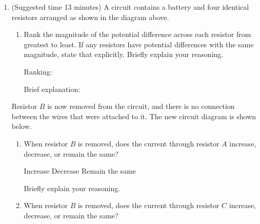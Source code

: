 \documentclass{../../../oss-apphys}
\begin{document}
\newpage


\genfreedirections

\begin{center}
\end{center}
\begin{enumerate}[leftmargin=15pt]

\item (Suggested time 13 minutes) A circuit contains a battery and four
  identical resistors arranged as shown in the diagram above.
  \begin{enumerate}[leftmargin=15pt]
  \item Rank the magnitude of the potential difference across each resistor
    from greatest to least. If any resistors have potential differences with
    the same magnitude, state that explicitly. Briefly explain your reasoning.

    \vspace{.1in}Ranking:
    
    \vspace{.3in}Brief explanation:
  \end{enumerate}
  \vspace{.3in}Resistor $B$ is now removed from the circuit, and there is no
  connection between the wires that were attached to it. The new circuit
  diagram is shown below.
  \begin{center}
  \end{center}
  \begin{enumerate}[leftmargin=15pt,resume]
  \item When resistor $B$ is removed, does the current through resistor $A$
    increase, decrease, or remain the same?

    \vspace{.1in}
    \underline{\hspace{.3in}} Increase\hspace{.2in}
    \underline{\hspace{.3in}} Decrease\hspace{.2in}
    \underline{\hspace{.3in}} Remain the same
    
    \vspace{.1in}Briefly explain your reasoning.\vspace{.4in}
    
  \item When resistor $B$ is removed, does the current through resistor $C$
    increase, decrease, or remain the same?


\end{enumerate}
\end{enumerate}
\end{document}

